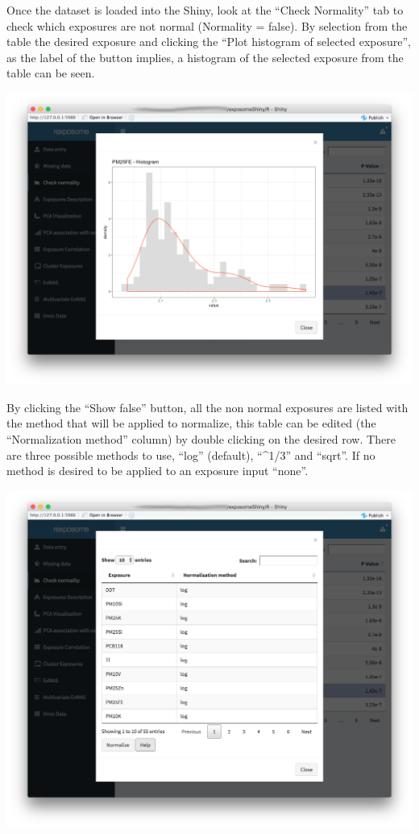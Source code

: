 \documentclass[
]{book}
\begin{document}
Once the dataset is loaded into the Shiny, look at the ``Check Normality'' tab to check which exposures are not normal (Normality = false). By selection from the table the desired exposure and clicking the ``Plot histogram of selected exposure'', as the label of the button implies, a histogram of the selected exposure from the table can be seen.

\includegraphics{images/analysis3_2.png}

By clicking the ``Show false'' button, all the non normal exposures are listed with the method that will be applied to normalize, this table can be edited (the ``Normalization method'' column) by double clicking on the desired row. There are three possible methods to use, ``log'' (default), ``\^{}1/3'' and ``sqrt''. If no method is desired to be applied to an exposure input ``none''.

\includegraphics{images/analysis3_3.png}
\end{document}
